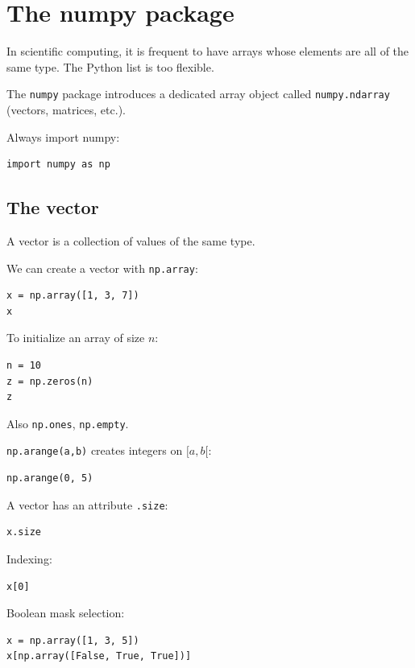 \documentclass[11pt]{article}
\begin{document}
\section{The numpy package}

In scientific computing, it is frequent to have arrays whose elements are all of the same type. The Python list is too flexible.

The \texttt{numpy} package introduces a dedicated array object called \texttt{numpy.ndarray} (vectors, matrices, etc.).

Always import numpy:

\begin{lstlisting}
import numpy as np
\end{lstlisting}

\subsection{The vector}

A vector is a collection of values of the same type.

We can create a vector with \texttt{np.array}:

\begin{lstlisting}
x = np.array([1, 3, 7])
x
\end{lstlisting}

To initialize an array of size $n$:

\begin{lstlisting}
n = 10
z = np.zeros(n)
z
\end{lstlisting}

Also \texttt{np.ones}, \texttt{np.empty}.

\texttt{np.arange(a,b)} creates integers on $[a,b[$:

\begin{lstlisting}
np.arange(0, 5)
\end{lstlisting}

A vector has an attribute \texttt{.size}:

\begin{lstlisting}
x.size
\end{lstlisting}

Indexing:

\begin{lstlisting}
x[0]
\end{lstlisting}

Boolean mask selection:

\begin{lstlisting}
x = np.array([1, 3, 5])
x[np.array([False, True, True])]
\end{lstlisting}
\end{document}
